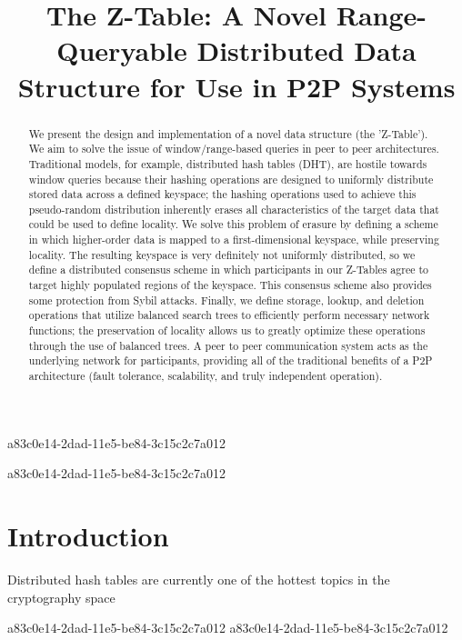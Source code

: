 \documentclass[12pt]{article}
\title{The Z-Table: A Novel Range-Queryable Distributed Data Structure for Use in P2P Systems}
\begin{document}
\maketitle
a83c0e14-2dad-11e5-be84-3c15c2c7a012
\begin{abstract}
We present the design and implementation of a novel data structure (the 'Z-Table'). We aim to solve the issue of window/range-based queries in peer to peer architectures. Traditional models, for example,  distributed hash tables (DHT), are hostile towards window queries because their hashing operations are designed to uniformly distribute stored data across a defined keyspace; the hashing operations used to achieve this pseudo-random distribution inherently erases all characteristics of the target data that could be used to define locality. We solve this problem of erasure by defining a scheme in which higher-order data is mapped to a first-dimensional keyspace, while preserving locality. The resulting keyspace is very definitely not uniformly distributed, so we define a distributed consensus scheme in which participants in our Z-Tables agree to target highly populated regions of the keyspace. This consensus scheme also provides some protection from Sybil attacks. Finally, we define storage, lookup, and deletion operations that utilize balanced search trees to efficiently perform necessary network functions; the preservation of locality allows us to greatly optimize these operations through the use of balanced trees. A peer to peer communication system acts as the underlying network for participants, providing all of the traditional benefits of a P2P architecture (fault tolerance, scalability, and truly independent operation).
\end{abstract}

a83c0e14-2dad-11e5-be84-3c15c2c7a012
\newpage
\section{Introduction}
Distributed hash tables are currently one of the hottest topics in the cryptography space~\cite{Stoica:2001dj,Rowstron:2001ea,Ratnasamy:2001wn}

a83c0e14-2dad-11e5-be84-3c15c2c7a012\printbibliography
a83c0e14-2dad-11e5-be84-3c15c2c7a012
\end{document}
